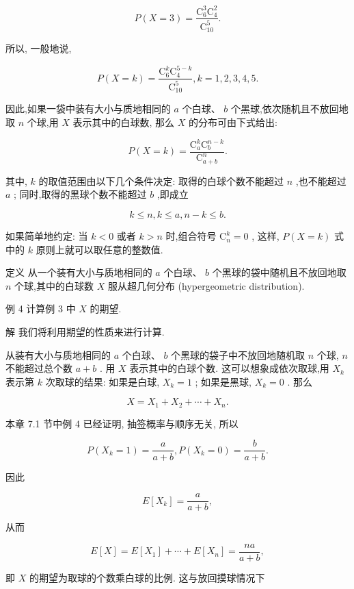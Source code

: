 \documentclass[10pt]{article}
\begin{document}
\[
P\left( {X = 3}\right)  = \frac{{\mathrm{C}}_{6}^{3}{\mathrm{C}}_{4}^{2}}{{\mathrm{C}}_{10}^{5}}.
\]

所以, 一般地说,



\[
P\left( {X = k}\right)  = \frac{{\mathrm{C}}_{6}^{k}{\mathrm{C}}_{4}^{5 - k}}{{\mathrm{C}}_{10}^{5}},k = 1,2,3,4,5.
\]

因此,如果一袋中装有大小与质地相同的 \(a\) 个白球、 \(b\) 个黑球,依次随机且不放回地取 \(n\) 个球,用 \(X\) 表示其中的白球数, 那么 \(X\) 的分布可由下式给出:

\[
P\left( {X = k}\right)  = \frac{{\mathrm{C}}_{a}^{k}{\mathrm{C}}_{b}^{n - k}}{{\mathrm{C}}_{a + b}^{n}}.
\]

其中, \(k\) 的取值范围由以下几个条件决定: 取得的白球个数不能超过 \(n\) ,也不能超过 \(a\) ; 同时,取得的黑球个数不能超过 \(b\) ,即成立

\[
k \leq  n,k \leq  a,n - k \leq  b.
\]

如果简单地约定: 当 \(k < 0\) 或者 \(k > n\) 时,组合符号 \({\mathrm{C}}_{n}^{k} = 0\) , 这样, \(P\left( {X = k}\right)\) 式中的 \(k\) 原则上就可以取任意的整数值.

定义 从一个装有大小与质地相同的 \(a\) 个白球、 \(b\) 个黑球的袋中随机且不放回地取 \(n\) 个球,其中的白球数 \(X\) 服从超几何分布 (hypergeometric distribution).

例 4 计算例 3 中 \(X\) 的期望.

解 我们将利用期望的性质来进行计算.

从装有大小与质地相同的 \(a\) 个白球、 \(b\) 个黑球的袋子中不放回地随机取 \(n\) 个球, \(n\) 不能超过总个数 \(a + b\) . 用 \(X\) 表示其中的白球个数. 这可以想象成依次取球,用 \({X}_{k}\) 表示第 \(k\) 次取球的结果: 如果是白球, \({X}_{k} = 1\) ; 如果是黑球, \({X}_{k} = 0\) . 那么

\[
X = {X}_{1} + {X}_{2} + \cdots  + {X}_{n}.
\]

本章 7.1 节中例 4 已经证明, 抽签概率与顺序无关, 所以

\[
P\left( {{X}_{k} = 1}\right)  = \frac{a}{a + b},P\left( {{X}_{k} = 0}\right)  = \frac{b}{a + b}.
\]

因此

\[
E\left\lbrack  {X}_{k}\right\rbrack   = \frac{a}{a + b},
\]

从而

\[
E\left\lbrack  X\right\rbrack   = E\left\lbrack  {X}_{1}\right\rbrack   + \cdots  + E\left\lbrack  {X}_{n}\right\rbrack   = \frac{na}{a + b},
\]

即 \(X\) 的期望为取球的个数乘白球的比例. 这与放回摸球情况下
\end{document}
